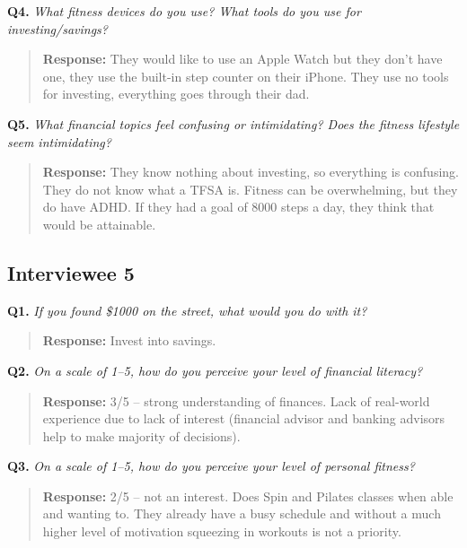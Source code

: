 \documentclass[12pt]{article}
\begin{document}
\medskip
\noindent\textbf{Q4.} \textit{What fitness devices do you use? What tools do you use for investing/savings?}

\begin{quote}
\textbf{Response:} They would like to use an Apple Watch but they don't have one, they use the built-in step counter on their iPhone. They use no tools for investing, everything goes through their dad.\par
\end{quote}

\medskip
\noindent\textbf{Q5.} \textit{What financial topics feel confusing or intimidating? Does the fitness lifestyle seem intimidating?}

\begin{quote}
\textbf{Response:} They know nothing about investing, so everything is confusing. They do not know what a TFSA is. Fitness can be overwhelming, but they do have ADHD. If they had a goal of 8000 steps a day, they think that would be attainable.\par
\end{quote}

\subsection{Interviewee 5}

\medskip
\noindent\textbf{Q1.} \textit{If you found \$1000 on the street, what would you do with it?}

\begin{quote}
\textbf{Response:} Invest into savings.\par
\end{quote}

\medskip
\noindent\textbf{Q2.} \textit{On a scale of 1--5, how do you perceive your level of financial literacy?}

\begin{quote}
\textbf{Response:} 3/5 -- strong understanding of finances. Lack of real-world experience due to lack of interest (financial advisor and banking advisors help to make majority of decisions).\par
\end{quote}

\medskip
\noindent\textbf{Q3.} \textit{On a scale of 1--5, how do you perceive your level of personal fitness?}

\begin{quote}
\textbf{Response:} 2/5 -- not an interest. Does Spin and Pilates classes when able and wanting to. They already have a busy schedule and without a much higher level of motivation squeezing in workouts is not a priority.\par
\end{quote}
\end{document}
